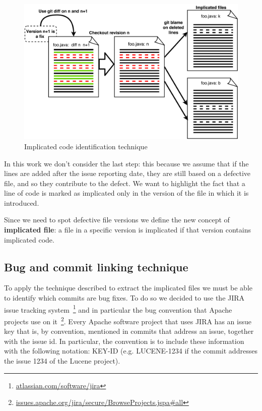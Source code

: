 \begin{figure}[ht]
    \centering
    \includegraphics[width=\columnwidth]{images/implicated.png}
    \caption{Implicated code identification technique}
    \label{fig:implicated}
\end{figure}

In this work we don't consider the last step: this because we assume that if the lines are added after the issue reporting date, they are still based on a defective file, and so they contribute to the defect. We want to highlight the fact that a line of code is marked as implicated only in the version of the file in which it is introduced.

Since we need to spot defective file versions we define the new concept of \textbf{implicated file}: a file in a specific version is implicated if that version contains implicated code.

\subsection{Bug and commit linking technique}
\label{sec:bug-linking}
To apply the technique described to extract the implicated files we must be able to identify which commits are bug fixes. To do so we decided to use the JIRA issue tracking system~\footnote{\url{atlassian.com/software/jira}} and in particular the bug convention that Apache projects use on it~\footnote{\url{issues.apache.org/jira/secure/BrowseProjects.jspa\#all}}. Every Apache software project that uses JIRA has an issue key that is, by convention, mentioned in commits that address an issue, together with the issue id. In particular, the convention is to include these information with the following notation: KEY-ID (e.g. LUCENE-1234 if the commit addresses the issue 1234 of the Lucene project).

